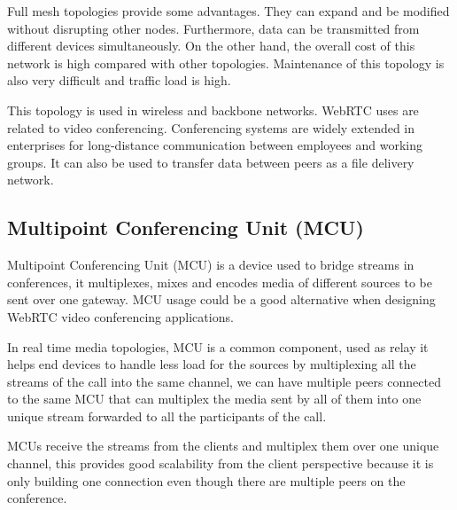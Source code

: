 Full mesh topologies provide some advantages. They can expand and be modified without disrupting other nodes. Furthermore, data can be transmitted from different devices simultaneously. On the other hand, the overall cost of this network is high compared with other topologies. Maintenance of this topology is also very difficult and traffic load is high.

This topology is used in wireless and backbone networks. WebRTC uses are related to video conferencing. Conferencing systems are widely extended in enterprises for long-distance communication between employees and working groups. It can also be used to transfer data between peers as a file delivery network. 

%	
%		
%

\subsection{Multipoint Conferencing Unit (MCU)}

Multipoint Conferencing Unit (MCU)  is a device used to bridge streams in conferences, it multiplexes, mixes and encodes media of different sources to be sent over one gateway. MCU usage could be a good alternative when designing WebRTC video conferencing applications. %

In real time media topologies, MCU is a common component, used as relay it helps end devices to handle less load for the sources by multiplexing all the streams of the call into the same channel, we can have multiple peers connected to the same MCU that can multiplex the media sent by all of them into one unique stream forwarded to all the participants of the call.

MCUs receive the streams from the clients and multiplex them over one unique channel, this provides good scalability from the client perspective because it is only building one connection even though there are multiple peers on the conference.

